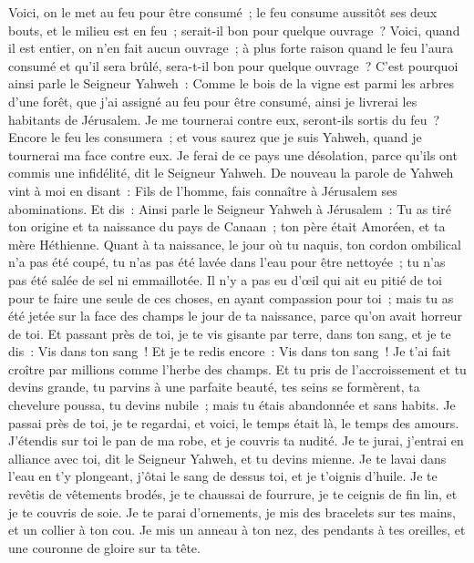 \begin{multicols}{2}
Voici, on le met au feu pour être consumé~; le feu consume aussitôt ses deux bouts, et le milieu est en feu~; serait-il bon pour quelque ouvrage~?
Voici, quand il est entier, on n'en fait aucun ouvrage~; à plus forte raison quand le feu l'aura consumé et qu'il sera brûlé, sera-t-il bon pour quelque ouvrage~?
C'est pourquoi ainsi parle le Seigneur Yahweh~: Comme le bois de la vigne est parmi les arbres d'une forêt, que j'ai assigné au feu pour être consumé, ainsi je livrerai les habitants de Jérusalem.
Je me tournerai contre eux, seront-ils sortis du feu~? Encore le feu les consumera~; et vous saurez que je suis Yahweh, quand je tournerai ma face contre eux.
Je ferai de ce pays une désolation, parce qu'ils ont commis une infidélité, dit le Seigneur Yahweh.
\VerseOne{}De nouveau la parole de Yahweh vint à moi en disant~:
Fils de l'homme, fais connaître à Jérusalem ses abominations.
Et dis~: Ainsi parle le Seigneur Yahweh à Jérusalem~: Tu as tiré ton origine et ta naissance du pays de Canaan~; ton père était Amoréen, et ta mère Héthienne.
Quant à ta naissance, le jour où tu naquis, ton cordon ombilical n'a pas été coupé, tu n'as pas été lavée dans l'eau pour être nettoyée~; tu n'as pas été salée de sel ni emmaillotée.
Il n'y a pas eu d'œil qui ait eu pitié de toi pour te faire une seule de ces choses, en ayant compassion pour toi~; mais tu as été jetée sur la face des champs le jour de ta naissance, parce qu'on avait horreur de toi.
Et passant près de toi, je te vis gisante par terre, dans ton sang, et je te dis~: Vis dans ton sang~! Et je te redis encore~: Vis dans ton sang~!
Je t'ai fait croître par millions comme l'herbe des champs. Et tu pris de l'accroissement et tu devins grande, tu parvins à une parfaite beauté, tes seins se formèrent, ta chevelure poussa, tu devins nubile~; mais tu étais abandonnée et sans habits.
Je passai près de toi, je te regardai, et voici, le temps était là, le temps des amours. J'étendis sur toi le pan de ma robe, et je couvris ta nudité. Je te jurai, j'entrai en alliance avec toi, dit le Seigneur Yahweh, et tu devins mienne.
Je te lavai dans l'eau en t'y plongeant, j'ôtai le sang de dessus toi, et je t'oignis d'huile.
Je te revêtis de vêtements brodés, je te chaussai de fourrure, je te ceignis de fin lin, et je te couvris de soie.
Je te parai d'ornements, je mis des bracelets sur tes mains, et un collier à ton cou.
Je mis un anneau à ton nez, des pendants à tes oreilles, et une couronne de gloire sur ta tête.

\end{multicols}
